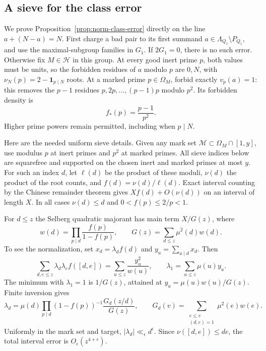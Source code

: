 \subsection{A sieve for the class error}

We prove Proposition~\ref{prop:norm-class-error} directly on the line
$a+(N-a)=N$. First charge a bad pair to its first summand
\(a\in\Lambda_{Q_1}\setminus P_{Q_1}\), and use the maximal-subgroup
families in \(G_1\). If \(2G_1=0\), there is no such error.
Otherwise fix \(M\in\mathcal H\) in this group. At every good inert
prime $p$, both values must be units,
so the forbidden residues of $a$ modulo $p$ are $0,N$, with
$\nu_N(p)=2-\mathbf1_{p\mid N}$ roots.  At a marked prime
$p\in\Omega_M$, forbid exactly $v_p(a)=1$: this removes the $p-1$
residues $p,2p,\ldots,(p-1)p$ modulo $p^2$.  Its forbidden density is
\[
 f_*(p)=\frac{p-1}{p^2}.
\]
Higher prime powers remain permitted, including when $p\mid N$.

Here are the needed uniform sieve details.  Given any mark set
$\mathcal M\subset\Omega_M\cap[1,y]$, use modulus $p$ at inert primes
and $p^2$ at marked primes. All sieve indices below are squarefree
and supported on the chosen inert and marked primes at most $y$.
For such an index $d$, let
$\ell(d)$ be the product of these moduli, $\nu(d)$ the product of
the root counts, and $f(d)=\nu(d)/\ell(d)$.  Exact interval counting
by the Chinese remainder theorem gives $Xf(d)+O(\nu(d))$ on an
interval of length $X$.  In all cases $\nu(d)\le d$ and
$0<f(p)\le2/p<1$.

For $d\le z$ the Selberg quadratic majorant has main term $X/G(z)$,
where
\[
 w(d)=\prod_{p\mid d}\frac{f(p)}{1-f(p)},\qquad
 G(z)=\sum_{d\le z}\mu^2(d)w(d).
\]
To see the normalization, set $x_d=\lambda_df(d)$ and
$y_u=\sum_{u\mid d}x_d$.  Then
\[
 \sum_{d,e\le z}\lambda_d\lambda_e f([d,e])
       =\sum_{u\le z}\frac{y_u^2}{w(u)},\qquad
 \lambda_1=\sum_{u\le z}\mu(u)y_u.
\]
The minimum with $\lambda_1=1$ is $1/G(z)$, attained at
$y_u=\mu(u)w(u)/G(z)$.  Finite inversion gives
\[
 \lambda_d=\mu(d)\prod_{p\mid d}(1-f(p))^{-1}
       \frac{G_d(z/d)}{G(z)},\qquad
 G_d(v)=\sum_{\substack{e\le v\\(d,e)=1}}\mu^2(e)w(e).
\]
Uniformly in the mark set and target, $|\lambda_d|\ll_\epsilon d^\epsilon$.
Since $\nu([d,e])\le de$, the total interval error is
$O_\epsilon(z^{4+\epsilon})$.

